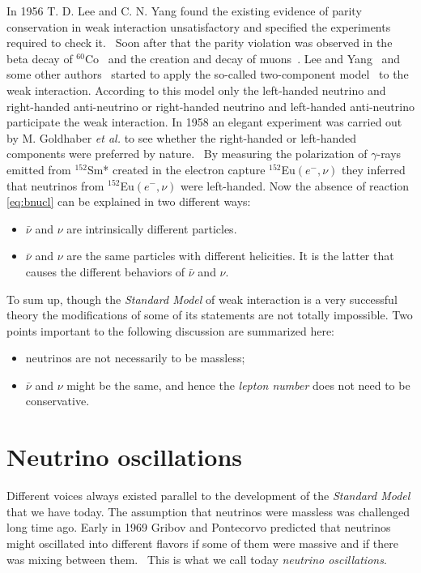 In 1956 T. D. Lee and C. N. Yang found the existing evidence of parity conservation in weak interaction unsatisfactory and specified the experiments required to check it.~\cite{Lee56} Soon after that the parity violation was observed in the beta decay of $^{60}$Co~\cite{Wu57} and the creation and decay of muons~\cite{Gar57,Fri57}. Lee and Yang~\cite{Lee57} and some other authors~\cite{Sal57,Lan57} started to apply the so-called two-component model~\cite{Wey29} to the weak interaction. According to this model only the left-handed neutrino and right-handed anti-neutrino or right-handed neutrino and left-handed anti-neutrino participate the weak interaction. In 1958 an elegant experiment was carried out by M. Goldhaber \textit{et al.} to see whether the right-handed or left-handed components were preferred by nature.~\cite{Gol58} By measuring the polarization of $\gamma$-rays emitted from $^{152}$Sm* created in the electron capture $^{152}$Eu$(e^-,\nu)$ they inferred that neutrinos from $^{152}$Eu$(e^-,\nu)$ were left-handed. Now the absence of reaction \ref{eq:bnucl} can be explained in two different ways:
\begin{itemize}
\item $\bar{\nu}$ and $\nu$ are intrinsically different particles.
\item $\bar{\nu}$ and $\nu$ are the same particles with different
  helicities. It is the latter that causes the different behaviors of
  $\bar{\nu}$ and $\nu$.
\end{itemize}

To sum up, though the \emph{Standard Model} of weak interaction is a very successful theory the modifications of some of its statements are not totally impossible. Two points important to the following discussion are summarized here:
\begin{itemize}
\item neutrinos are not necessarily to be massless;
\item $\bar{\nu}$ and $\nu$ might be the same, and hence the
  \emph{lepton number} does not need to be conservative.
\end{itemize}


\section{Neutrino oscillations}
\label{sec:osci}
Different voices always existed parallel to the development of the \emph{Standard Model} that we have today. The assumption that neutrinos were massless was challenged long time ago. Early in 1969 Gribov and Pontecorvo predicted that neutrinos might oscillated into different flavors if some of them were massive and if there was mixing between them.~\cite{Gri69} This is what we call today \emph{neutrino oscillations}.


